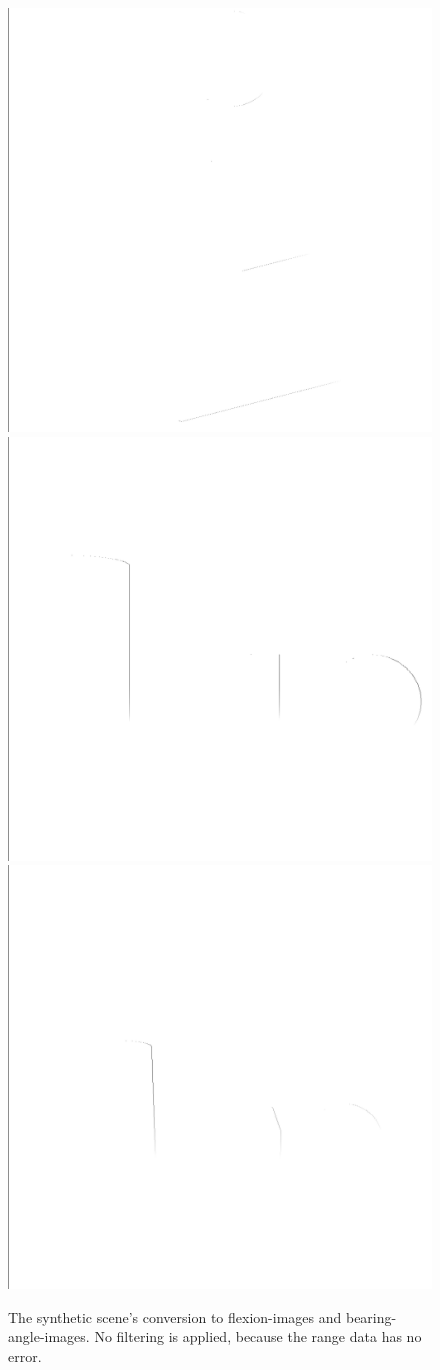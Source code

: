 \begin{figure}[H]
    \includegraphics[width=0.25\linewidth]{chapter06/results/conv_images/synthetic/bearing/raw/0080.png}%
    \includegraphics[width=0.25\linewidth]{chapter06/results/conv_images/synthetic/bearing/raw/0120.png}%
    \includegraphics[width=0.25\linewidth]{chapter06/results/conv_images/synthetic/bearing/raw/0160.png}%
    \caption{The synthetic scene's conversion to \glspl{flexion-image} and \glspl{bearing-angle-image}. No filtering is applied, because the range data has no error.}
\end{figure}
